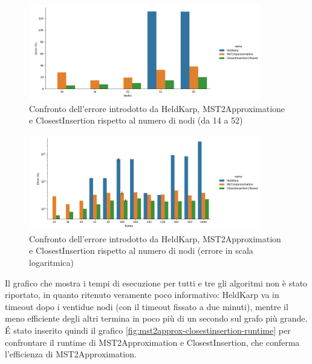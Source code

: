 \begin{figure}[H]
    \centering

    \includegraphics[width=0.9\textwidth]{./images/HeldKarp_vs_MST2Approximation_vs_ClosestInsertion1Round__approximation_error__limited_to_52_nodes_.png}

    \caption{Confronto dell'errore introdotto da HeldKarp, MST2Approximatione e ClosestInsertion rispetto al numero di nodi (da 14 a 52)}
    \label{fig:heldkarp-mst2approx-closestinsertion-accuracy-error-52-nodes}
\end{figure}

\begin{figure}[H]
    \centering

    \includegraphics[width=0.9\textwidth]{./images/HeldKarp_vs_MST2Approximation_vs_ClosestInsertion1Round__approximation_error__y_log_scaled_.png}

    \caption{Confronto dell'errore introdotto da HeldKarp, MST2Approximation e ClosestInsertion rispetto al numero di nodi (errore in scala logaritmica)}
    \label{fig:heldkarp-mst2approx-closestinsertion-accuracy-error}
\end{figure}

\noindent Il grafico che mostra i tempi di esecuzione per tutti e tre
gli algoritmi non è stato riportato, in quanto ritenuto veramente poco
informativo: HeldKarp va in timeout dopo i ventidue nodi (con il
timeout fissato a due minuti), mentre il meno efficiente degli altri
termina in poco più di un secondo sul grafo più grande. \'E stato
inserito quindi il grafico
\ref{fig:mst2approx-closestinsertion-runtime} per confrontare il
runtime di MST2Approximation e ClosestInsertion, che conferma
l'efficienza di MST2Approximation.

